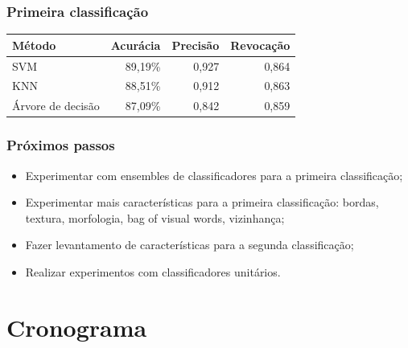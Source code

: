 \documentclass[t]{beamer}
\begin{document}
\begin{frame}[c]
	\frametitle{Primeira classificação}
	
	\small{
	\begin{table}[h]
	\centering
	\begin{tabulary}{\linewidth}{|L|R|R|R|}
		\hline
		\textbf{Método} & \textbf{Acurácia} & \textbf{Precisão} & \textbf{Revocação} \\ \hline
		SVM               & 89,19\% & 0,927 & 0,864 \\ \hline
		KNN               & 88,51\% & 0,912 & 0,863 \\ \hline
		Árvore de decisão & 87,09\% & 0,842 & 0,859 \\ \hline
	\end{tabulary}
	\end{table}
	}


\end{frame}

\begin{frame}
	\frametitle{Próximos passos}
	
	\begin{itemize}
		\item Experimentar com ensembles de classificadores para a primeira classificação;
		\item Experimentar mais características para a primeira classificação: bordas, textura, morfologia, bag of visual words, vizinhança;
		\item Fazer levantamento de características para a segunda classificação;
		\item Realizar experimentos com classificadores unitários.
	\end{itemize}

\end{frame}

\section{Cronograma}
\end{document}
